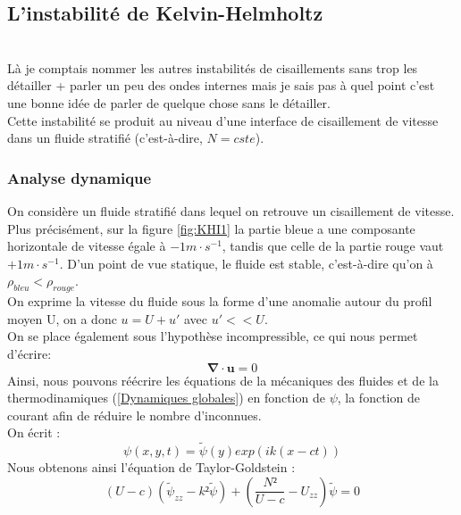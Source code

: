 \documentclass{rapportECC}
\begin{document}
\subsection{L'instabilité de Kelvin-Helmholtz}
\label{KHI}
\\
Là je comptais nommer les autres instabilités de cisaillements sans trop les détailler + parler un peu des ondes internes mais je sais pas à quel point c'est une bonne idée de parler de quelque chose sans le détailler.
\\
Cette instabilité se produit au niveau d'une interface de cisaillement de vitesse dans un fluide stratifié (c'est-à-dire, $N = cste$). \\

\subsubsection{Analyse dynamique}

On considère un fluide stratifié dans lequel on retrouve un cisaillement de vitesse. Plus précisément, sur la figure \ref{fig:KHI1} la partie bleue a une composante horizontale de vitesse égale à $-1 m \cdot s^{-1}$, tandis que celle de la partie rouge vaut $+1 m \cdot s^{-1}$. D'un point de vue statique, le fluide est stable, c'est-à-dire qu'on à $\rho_{bleu} < \rho_{rouge}$. \\
On exprime la vitesse du fluide sous la forme d'une anomalie autour du profil moyen U, on a donc $u = U+u'$ avec $u'<<U$. \\
On se place également sous l'hypothèse incompressible, ce qui nous permet d'écrire: 
\begin{equation}
    \mathbf{\nabla} \cdot \mathbf{u} = 0
\end{equation}
Ainsi, nous pouvons réécrire les équations de la mécaniques des fluides et de la thermodinamiques (\ref{Dynamiques globales}) en fonction de $\psi$, la fonction de courant afin de réduire le nombre d'inconnues.
\\
On écrit :
\begin{equation}
    \psi(x,y,t) = \tilde{\psi}(y)exp(ik(x-ct))
    \label{eq: fct courant}
\end{equation}
Nous obtenons ainsi l'équation de Taylor-Goldstein : \\
\begin{equation}
    (U - c)(\tilde{\psi}_{zz} - k²\tilde{\psi}) + (\frac{N²}{U - c} - U_{zz})\tilde{\psi} = 0
    \label{eq: taylor goldstein}
\end{equation}
\end{document}
